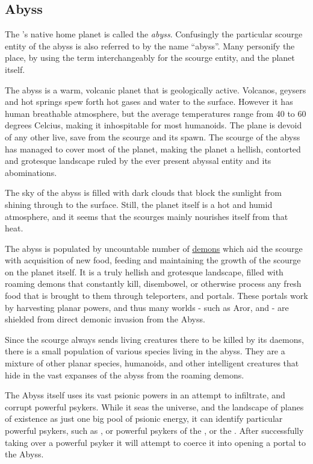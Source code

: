 \subsection{Abyss}
\label{sec:Abyss}


The 's native home planet is called the \emph{abyss}.
Confusingly the particular scourge entity of the abyss is also referred to by
the name ``abyss''. Many personify the place, by using the term
interchangeably for the scourge entity, and the planet itself.

The abyss is a warm, volcanic planet that is geologically active. Volcanos,
geysers and hot springs spew forth hot gases and water to the surface. However
it has human breathable atmosphere, but the average temperatures range from 40
to 60 degrees Celcius, making it inhospitable for most humanoids. The plane is
devoid of any other live, save from the scourge and its spawn. The scourge of
the abyss has managed to cover most of the planet, making the planet a
hellish, contorted and grotesque landscape ruled by the ever present
abyssal entity and its abominations.

The sky of the abyss is filled with dark clouds that block the sunlight from
shining through to the surface. Still, the planet itself is a hot and humid
atmosphere, and it seems that the scourges mainly nourishes itself from that
heat.

The abyss is populated by uncountable number of \hyperref[sec:Demons]{demons}
which aid the scourge with acquisition of new food, feeding and maintaining
the growth of the scourge on the planet itself. It is a truly hellish and
grotesque landscape, filled with roaming demons that constantly kill,
disembowel, or otherwise process any fresh food that is brought to them through
teleporters, and portals. These portals work by harvesting planar powers, and
thus many worlds - such as Aror, and  - are shielded from
direct demonic invasion from the Abyss.

Since the scourge always sends living creatures there to be killed by its
daemons, there is a small population of various species living in the abyss.
They are a mixture of other planar species, humanoids, and other intelligent
creatures that hide in the vast expanses of the abyss from the roaming demons.

The Abyss itself uses its vast psionic powers in an attempt to infiltrate, and
corrupt powerful psykers. While it seas the universe, and the landscape of
planes of existence as just one big pool of psionic energy, it can identify
particular powerful psykers, such as , or powerful psykers
of the , or the .
After successfully taking over a powerful psyker it will attempt to coerce
it into opening a portal to the Abyss.
